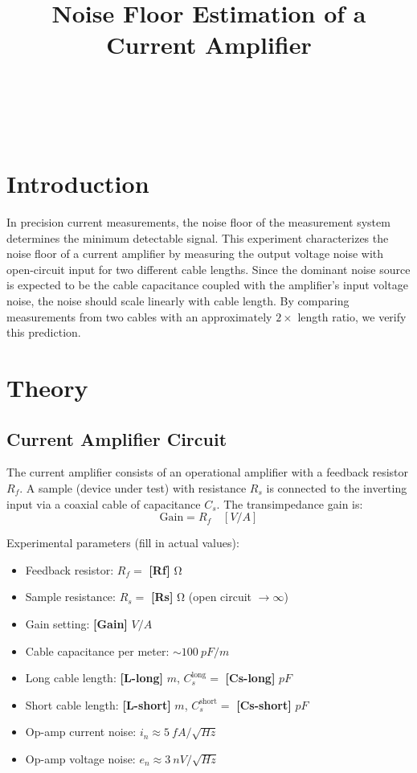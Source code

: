 \documentclass[11pt,a4paper]{article}
\title{Noise Floor Estimation of a Current Amplifier}
\author{
  \placeholder{Student Name 1} \\
  \placeholder{Student Name 2} \\
  \placeholder{Student Name 3} \\[1em]
  \placeholder{Department, Seoul National University}
}
\date{\placeholder{Experiment Date}}
\newcommand{\placeholder}[1]{\textbf{[#1]}}
\begin{document}
\maketitle

\section{Introduction}

In precision current measurements, the noise floor of the measurement system
determines the minimum detectable signal. This experiment characterizes the
noise floor of a current amplifier by measuring the output voltage noise
with open-circuit input for two different cable lengths. Since the dominant
noise source is expected to be the cable capacitance coupled with the
amplifier's input voltage noise, the noise should scale linearly with cable
length. By comparing measurements from two cables with an approximately
$2\times$ length ratio, we verify this prediction.

\section{Theory}

\subsection{Current Amplifier Circuit}

The current amplifier consists of an operational amplifier with a feedback
resistor $R_f$. A sample (device under test) with resistance $R_s$ is
connected to the inverting input via a coaxial cable of capacitance $C_s$.
The transimpedance gain is:
\begin{equation}
  \text{Gain} = R_f \quad [\si{V/A}]
\end{equation}

\noindent Experimental parameters (fill in actual values):
\begin{itemize}
  \item Feedback resistor: $R_f = $ \placeholder{Rf} $\si{\ohm}$
  \item Sample resistance: $R_s = $ \placeholder{Rs} $\si{\ohm}$ (open circuit $\to \infty$)
  \item Gain setting: \placeholder{Gain} $\si{V/A}$
  \item Cable capacitance per meter: $\sim \SI{100}{pF/m}$
  \item Long cable length: \placeholder{L-long} $\si{m}$,
        $C_s^{\text{long}} = $ \placeholder{Cs-long} $\si{pF}$
  \item Short cable length: \placeholder{L-short} $\si{m}$,
        $C_s^{\text{short}} = $ \placeholder{Cs-short} $\si{pF}$
  \item Op-amp current noise: $i_n \approx \SI{5}{fA/\sqrt{Hz}}$
  \item Op-amp voltage noise: $e_n \approx \SI{3}{nV/\sqrt{Hz}}$
\end{itemize}
\end{document}

